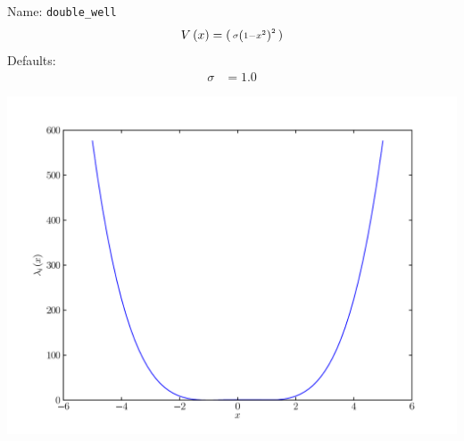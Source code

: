 \documentclass[a4paper,10pt]{report}
\begin{document}
\begin{minipage}{0.5\linewidth}
  Name:    \texttt{double\_well}
  \begin{equation*}
    V\left( x \right) = \left(\begin{smallmatrix}\sigma \left(1 - x^{2}\right)^{2}\end{smallmatrix}\right)
  \end{equation*}
  Defaults:
  \begin{align*}
    \sigma & = 1.0
  \end{align*}
\end{minipage}
\begin{minipage}{0.5\linewidth}
  \begin{center}
    \includegraphics[scale=0.25]{./fig/double_well.pdf}
  \end{center}
\end{minipage}
\end{document}
